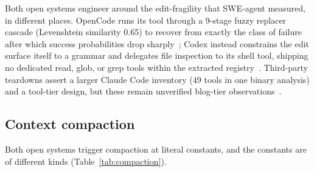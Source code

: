\documentclass{article}
\newcommand{\codex}[0]{Codex}
\newcommand{\occ}[0]{OpenCode}
\newcommand{\ccc}[0]{Claude Code}
\begin{document}
Both open systems engineer around the edit-fragility that SWE-agent
measured, in different places. \occ{} runs its  tool through a
9-stage fuzzy replacer cascade (Levenshtein similarity 0.65) to recover
from exactly the class of failure after which success probabilities drop
sharply~\citep{yang2024sweagent,opencodeRepo}; \codex{} instead
constrains the edit surface itself to a grammar and delegates file
inspection to its shell tool, shipping no dedicated read, glob, or grep
tools within the extracted registry~\citep{codexRepo}. Third-party
teardowns assert a larger \ccc{} inventory (49 tools in one binary
analysis) and a tool-tier design, but these remain unverified blog-tier
observations~\citep{tenguDecoded,minusXClaudeCodeTeardown}.

\subsection{Context compaction}
\label{sec:compaction}

Both open systems trigger compaction at literal constants, and the
constants are of different kinds (Table~\ref{tab:compaction}).
\end{document}
